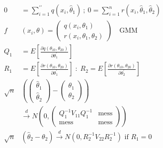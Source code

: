 \begin{align*}
    0 & =\sum_{i=1}^{\prime \prime} q\left(x_i, \widehat{\theta}_1\right) \: ; \:
    0 =\sum_{i=1}^n r\left(x_i, \widehat{\theta}_1, \widehat{\theta}_2\right) \\
    f&\left(x_i, \theta\right)=\left(
    \begin{array}{c}
        q\left(x_i, \theta_1\right) \\
        r\left(x_i, \theta_1, \theta_2\right)
    \end{array}\right) \quad \text{GMM} \\
    Q_1 &= E\left[\frac{\partial q\left(\theta_{10}, \theta_{20}\right)}{\partial \theta_1^{\prime}}\right] \\
    R_1 &= E\left[\frac{\partial r\left(\theta_{10}, \theta_{20}\right)}{\partial \theta_1^{\prime}}\right] \;:\;
    R_2 = E\left[\frac{\partial r\left(\theta_{10}, \theta_{20}\right)}{\partial \theta_2^{\prime}}\right] \\
    \sqrt{n} & \left(\left(
    \begin{array}{c}
        \widehat{\theta}_1 \\
        \widehat{\theta}_2
    \end{array}\right)-\left(
    \begin{array}{c}
        \theta_{1} \\
        \theta_{2}
    \end{array}\right)\right) \\
    &\stackrel{d}{\longrightarrow} N\left(0,\left(
    \begin{array}{cc}
        Q_1^{-1} V_{11} Q_1^{-1} & \text {mess} \\
        \text {mess} & \text {mess}
    \end{array}\right)\right) \\
    \sqrt{n} & \left(\widehat{\theta}_2-\theta_{2}\right) \stackrel{d}{\longrightarrow} N\left(0, R_2^{-1} V_{22} R_2^{-1}\right) \text{ if } R_1 =  0
\end{align*}